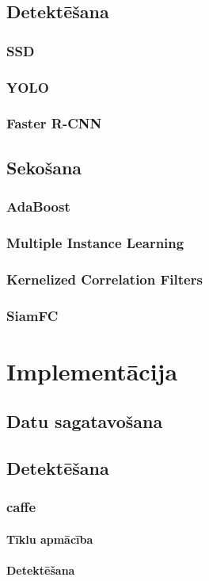 \documentclass[12pt,paper=a4]{report}
\begin{document}
\section{Detektēšana}
\subsection{SSD}
\subsection{YOLO}
\subsection{Faster R-CNN}
\section{Sekošana}
\subsection{AdaBoost}
\subsection{Multiple Instance Learning}
\subsection{Kernelized Correlation Filters}
\subsection{SiamFC}
\chapter{Implementācija}
\section{Datu sagatavošana}
\section{Detektēšana}
\subsection{caffe}
\subsubsection{Tīklu apmācība}
\subsubsection{Detektēšana}
\end{document}
